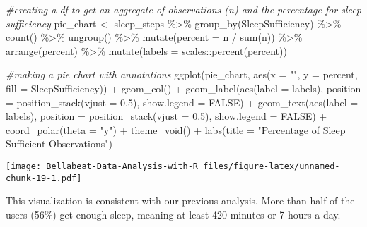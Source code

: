\documentclass[
]{article}
\newenvironment{Shaded}{\begin{snugshade}}{\end{snugshade}}
\newcommand{\AttributeTok}[1]{\textcolor[rgb]{0.77,0.63,0.00}{#1}}
\newcommand{\CommentTok}[1]{\textcolor[rgb]{0.56,0.35,0.01}{\textit{#1}}}
\newcommand{\ConstantTok}[1]{\textcolor[rgb]{0.00,0.00,0.00}{#1}}
\newcommand{\FloatTok}[1]{\textcolor[rgb]{0.00,0.00,0.81}{#1}}
\newcommand{\FunctionTok}[1]{\textcolor[rgb]{0.00,0.00,0.00}{#1}}
\newcommand{\NormalTok}[1]{#1}
\newcommand{\OtherTok}[1]{\textcolor[rgb]{0.56,0.35,0.01}{#1}}
\newcommand{\SpecialCharTok}[1]{\textcolor[rgb]{0.00,0.00,0.00}{#1}}
\newcommand{\StringTok}[1]{\textcolor[rgb]{0.31,0.60,0.02}{#1}}
\begin{document}
\begin{Shaded}
\begin{Highlighting}[]
\CommentTok{\#creating a df to get an aggregate of observations (n) and the percentage for sleep sufficiency}
\NormalTok{pie\_chart }\OtherTok{\textless{}{-}}\NormalTok{ sleep\_steps }\SpecialCharTok{\%\textgreater{}\%} 
  \FunctionTok{group\_by}\NormalTok{(SleepSufficiency) }\SpecialCharTok{\%\textgreater{}\%} 
  \FunctionTok{count}\NormalTok{() }\SpecialCharTok{\%\textgreater{}\%} 
  \FunctionTok{ungroup}\NormalTok{() }\SpecialCharTok{\%\textgreater{}\%} 
  \FunctionTok{mutate}\NormalTok{(}\AttributeTok{percent =}\NormalTok{ n }\SpecialCharTok{/} \FunctionTok{sum}\NormalTok{(n)) }\SpecialCharTok{\%\textgreater{}\%} 
  \FunctionTok{arrange}\NormalTok{(percent) }\SpecialCharTok{\%\textgreater{}\%} 
  \FunctionTok{mutate}\NormalTok{(}\AttributeTok{labels =}\NormalTok{ scales}\SpecialCharTok{::}\FunctionTok{percent}\NormalTok{(percent))}

\CommentTok{\#making a pie chart with annotations}
\FunctionTok{ggplot}\NormalTok{(pie\_chart, }\FunctionTok{aes}\NormalTok{(}\AttributeTok{x =} \StringTok{""}\NormalTok{, }\AttributeTok{y =}\NormalTok{ percent, }\AttributeTok{fill =}\NormalTok{ SleepSufficiency)) }\SpecialCharTok{+}
  \FunctionTok{geom\_col}\NormalTok{() }\SpecialCharTok{+}
  \FunctionTok{geom\_label}\NormalTok{(}\FunctionTok{aes}\NormalTok{(}\AttributeTok{label =}\NormalTok{ labels), }\AttributeTok{position =} \FunctionTok{position\_stack}\NormalTok{(}\AttributeTok{vjust =} \FloatTok{0.5}\NormalTok{), }\AttributeTok{show.legend =} \ConstantTok{FALSE}\NormalTok{) }\SpecialCharTok{+}
  \FunctionTok{geom\_text}\NormalTok{(}\FunctionTok{aes}\NormalTok{(}\AttributeTok{label =}\NormalTok{ labels), }\AttributeTok{position =} \FunctionTok{position\_stack}\NormalTok{(}\AttributeTok{vjust =} \FloatTok{0.5}\NormalTok{), }\AttributeTok{show.legend =} \ConstantTok{FALSE}\NormalTok{) }\SpecialCharTok{+}
  \FunctionTok{coord\_polar}\NormalTok{(}\AttributeTok{theta =} \StringTok{"y"}\NormalTok{) }\SpecialCharTok{+} 
  \FunctionTok{theme\_void}\NormalTok{() }\SpecialCharTok{+}
  \FunctionTok{labs}\NormalTok{(}\AttributeTok{title =} \StringTok{"Percentage of Sleep Sufficient Observations"}\NormalTok{)}
\end{Highlighting}
\end{Shaded}

\texttt{[image: Bellabeat-Data-Analysis-with-R\_files/figure-latex/unnamed-chunk-19-1.pdf]}

This visualization is consistent with our previous analysis. More than
half of the users (56\%) get enough sleep, meaning at least 420 minutes
or 7 hours a day.
\end{document}

